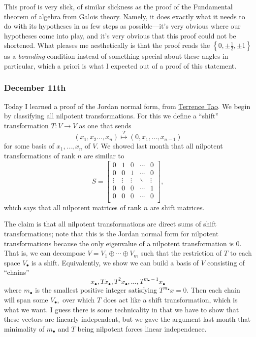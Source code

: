 This proof is very slick, of similar slickness as the proof of the Fundamental theorem of algebra from Galois theory. Namely, it does exactly what it needs to do with its hypotheses in as few steps as possible---it's very obvious where our hypotheses come into play, and it's very obvious that this proof could not be shortened. What pleases me aesthetically is that the proof reads the $\left\{0,\pm\frac12,\pm1\right\}$ as a \textit{bounding} condition instead of something special about these angles in particular, which a priori is what I expected out of a proof of this statement.

\subsubsection{December 11th}
Today I learned a proof of the Jordan normal form, from \href{https://terrytao.wordpress.com/2007/10/12/the-jordan-normal-form-and-the-euclidean-algorithm/}{Terrence Tao}. We begin by classifying all nilpotent transformations. For this we define a ``shift'' transformation $T:V\to V$ as one that sends 
\[(x_1,x_2\ldots,x_n)\stackrel T\longmapsto(0,x_1,\ldots,x_{n-1})\]
for some basis of $x_1,\ldots,x_n$ of $V.$ We showed last month that all nilpotent transformations of rank $n$ are similar to
\[S=\begin{bmatrix}
    0 & 1 & 0 & \cdots & 0 \\
    0 & 0 & 1 & \cdots & 0 \\
    \vdots & \vdots & \vdots & \ddots & \vdots \\
    0 & 0 & 0 & \cdots & 1 \\
    0 & 0 & 0 & \cdots & 0 \\
\end{bmatrix},\]
which says that all nilpotent matrices of rank $n$ are shift matrices.

The claim is that all nilpotent transformations are direct sums of shift transformations; note that this is the Jordan normal form for nilpotent transformations because the only eigenvalue of a nilpotent transformation is $0.$ That is, we can decompose $V=V_1\oplus\cdots\oplus V_m$ such that the restriction of $T$ to each space $V_\bullet$ is a shift. Equivalently, we show we can build a basis of $V$ consisting of ``chains''
\[x_\bullet,Tx_\bullet,T^2x_\bullet,\ldots,T^{m_\bullet-1}x_\bullet\]
where $m_\bullet$ is the smallest positive integer satisfying $T^{m_\bullet}x=0.$ Then each chain will span some $V_\bullet,$ over which $T$ does act like a shift transformation, which is what we want. I guess there is some technicality in that we have to show that these vectors are linearly independent, but we gave the argument last month that minimality of $m_\bullet$ and $T$ being nilpotent forces linear independence.

